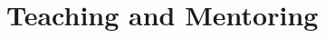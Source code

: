\documentclass[a4paper]{moderncv}
\begin{document}
\newpage{}
\section{Teaching and Mentoring}
%
%
\end{document}
